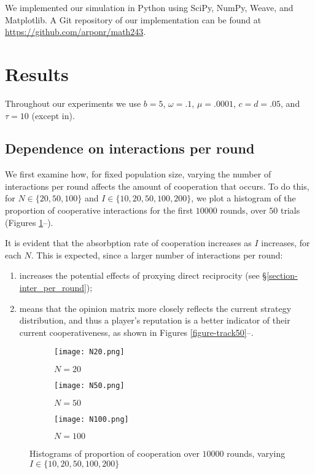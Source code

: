 \documentclass{amsart}
\begin{document}
We implemented our simulation in Python using SciPy, NumPy, Weave, and
Matplotlib. A Git repository of our implementation can be found at
\url{https://github.com/arponr/math243}.


\section{Results}
\label{section-results}

Throughout our experiments we use $b=5$, $\omega=.1$, $\mu=.0001$,
$c=d=.05$, and $\tau=10$ (except in).

\subsection{Dependence on interactions per round}

We first examine how, for fixed population size, varying the number of
interactions per round affects the amount of cooperation that
occurs. To do this, for $N \in \{20,50,100\}$ and $I \in
\{10,20,50,100,200\}$, we plot a histogram of the proportion of
cooperative interactions for the first $10000$ rounds, over $50$
trials (Figures \ref{figure-N20}--).

It is evident that the absorbption rate of cooperation increases as
$I$ increases, for each $N$. This is expected, since a larger number
of interactions per round:
\begin{enumerate}
\item increases the potential effects of proxying
  direct reciprocity (see \S\ref{section-inter_per_round});
\item means that the opinion matrix more closely reflects the current
  strategy distribution, and thus a player's reputation is a better
  indicator of their current cooperativeness, as shown in Figures
  \ref{figure-track50}--.
\end{enumerate}

\begin{figure}[h!tbp]  
  \begin{subfigure}{.485\linewidth}
    \centering
    \texttt{[image: N20.png]}
    \caption{$N=20$}
    \label{figure-N20}
  \end{subfigure}
  \hspace{.01\linewidth}
  \begin{subfigure}{.485\linewidth}  
    \centering
    \texttt{[image: N50.png]}
    \caption{$N=50$}
    \label{figure-N50}
  \end{subfigure}
  \begin{subfigure}{.485\linewidth}
    \centering
    \texttt{[image: N100.png]}
    \caption{$N=100$}
    \label{figure-N100}
  \end{subfigure}
  \caption{Histograms of proportion of cooperation over $10000$ rounds,
    varying $I \in \{10,20,50,100,200\}$}
\end{figure}
\end{document}
